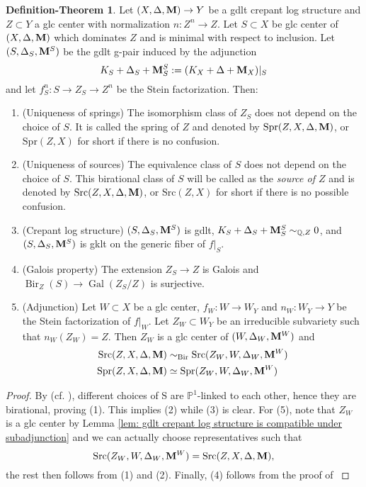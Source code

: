 \documentclass[11pt]{amsart}
\numberwithin{equation}{section}
\newcommand{\Mm}{{\bf{M}}}
\newcommand{\Src}{\mathrm{Src}}
\newcommand{\Spr}{\mathrm{Spr}}
\newcommand{\Pp}{\mathbb{P}}
\newcommand{\Qq}{\mathbb{Q}}
\newcommand{\Bir}{\operatorname{Bir}}
\newcommand{\Gal}{\operatorname{Gal}}
\theoremstyle{definition}
\theoremstyle{definition}
\newtheorem{defthm}[thm]{Definition-Theorem}
\theoremstyle{definition}
\begin{document}
\begin{defthm}\label{thm: spring and source for glc crepant log structure}
Let $(X,\Delta,\Mm)\rightarrow Y$ be a gdlt crepant log structure and $Z\subset Y$ a glc center with normalization $n: Z^n\rightarrow Z$. Let $S\subset X$ be glc center of $(X,\Delta,\Mm)$ which dominates $Z$ and is minimal with respect to inclusion. Let $(S,\Delta_S,\Mm^S)$ be the gdlt g-pair induced by the adjunction
$$K_S+\Delta_S+\Mm^S_S:=(K_X+\Delta+\Mm_X)|_S$$
and let $f^n_S: S\rightarrow Z_S\rightarrow Z^n$ be the Stein factorization. Then: 
\begin{enumerate}
    
    \item (Uniqueness of springs) The isomorphism class of $Z_S$ does not depend on the choice of $S$. It is called the spring of $Z$ and denoted by $\Spr(Z,X,\Delta,\Mm)$, or $\Spr(Z,X)$ for short if there is no confusion.
    \item (Uniqueness of sources) The equivalence class of $S$ does not depend on the choice of $S$. %
    This birational class of $S$ will be called as the \emph{source of $Z$} and is denoted by $\Src(Z,X,\Delta,\Mm)$, or $\Src(Z,X)$ for short if there is no possible confusion.
    \item (Crepant log structure) $(S,\Delta_S,\Mm^S)$ is gdlt, $K_S+\Delta_S+\Mm^S_S\sim_{\Qq,Z}0$, and $(S,\Delta_S,\Mm^S)$ is gklt on the generic fiber of $f|_S$.
    \item (Galois property) The extension $Z_S\to Z$ is Galois and $\Bir_Z(S)\to\Gal(Z_S/Z)$ is surjective.
    \item (Adjunction) Let $W\subset X$ be a glc center, $f_W: W\to W_Y$ and $n_W:W_Y\to Y$ be the Stein factorization of $f|_W$. Let $Z_W\subset W_Y$ be an irreducible subvariety such that $n_W(Z_W)=Z$. Then $Z_W$ is a glc center of $(W,\Delta_W,\Mm^W)$ and 
    \begin{align*}
        \Src(Z,X,\Delta,\Mm)&\sim_{\Bir}\Src(Z_W,W,\Delta_W,\Mm^W)\\
        \Spr(Z,X,\Delta,\Mm)&\simeq\Spr(Z_W,W,\Delta_W,\Mm^W)
    \end{align*}
    
\end{enumerate}
\end{defthm}
\begin{proof}
By \cite[Theorem 3.16]{LX22b}(cf. \cite[Theorem 1.4]{FS20}), different choices of S are $\Pp^1$-linked to each other, hence they are birational, proving (1). This implies (2) while (3) is clear. For (5), note that $Z_W$ is a glc center by Lemma \ref{lem: gdlt crepant log structure is compatible under subadjunction} and we can actually choose representatives such that 
$$
\Src(Z_W,W,\Delta_W,\Mm^W)=\Src(Z,X,\Delta,\Mm),
$$
the rest then follows from (1) and (2). Finally, (4) follows from the proof of \cite[Lemma 4.46]{Kol13}
\end{proof}
\end{document}

